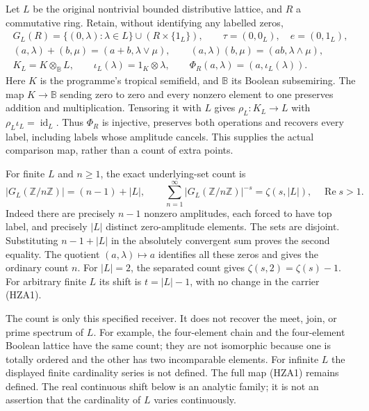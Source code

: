 Let $L$ be the original nontrivial bounded distributive lattice, and $R$
a commutative ring. Retain, without identifying any labelled zeros,
\begin{equation}\tag{HZA1}
\begin{gathered}
G_L(R)=\{(0,\lambda):\lambda\in L\}\cup(R\times\{1_L\}),\qquad
\tau=(0,0_L),\quad e=(0,1_L),\\
(a,\lambda)+(b,\mu)=(a+b,\lambda\vee\mu),\qquad
(a,\lambda)(b,\mu)=(ab,\lambda\wedge\mu),\\
K_L=K\otimes_{\mathbb B}L,\qquad
\iota_L(\lambda)=1_K\otimes\lambda,\qquad
\Phi_R(a,\lambda)=(a,\iota_L(\lambda)).
\end{gathered}
\end{equation}
Here $K$ is the programme's tropical semifield, and $\mathbb B$ its
Boolean subsemiring. The map $K\to\mathbb B$ sending zero to zero and
every nonzero element to one preserves addition and multiplication.
Tensoring it with $L$ gives $\rho_L:K_L\to L$ with
$\rho_L\iota_L=\operatorname{id}_L$. Thus $\Phi_R$ is injective,
preserves both operations and recovers every label, including labels
whose amplitude cancels. This supplies the actual comparison map,
rather than a count of extra points.

For finite $L$ and $n\ge1$, the exact underlying-set count is
\begin{equation}\tag{HZA2}
\left|G_L(\mathbb Z/n\mathbb Z)\right|=(n-1)+|L|,
\qquad
\sum_{n=1}^{\infty}\left|G_L(\mathbb Z/n\mathbb Z)\right|^{-s}
=\zeta(s,|L|),\quad \operatorname{Re}s>1.
\end{equation}
Indeed there are precisely $n-1$ nonzero amplitudes, each forced to
have top label, and precisely $|L|$ distinct zero-amplitude elements.
The sets are disjoint. Substituting $n-1+|L|$ in the absolutely
convergent sum proves the second equality. The quotient
$(a,\lambda)\mapsto a$ identifies all these zeros and gives the
ordinary count $n$. For $|L|=2$, the separated count gives
$\zeta(s,2)=\zeta(s)-1$. For arbitrary finite $L$ its shift is
$t=|L|-1$, with no change in the carrier (HZA1).

The count is only this specified receiver. It does not recover the
meet, join, or prime spectrum of $L$. For example, the four-element
chain and the four-element Boolean lattice have the same count;
they are not isomorphic because one is totally ordered and the other
has two incomparable elements. For infinite $L$ the displayed finite
cardinality series is not defined. The full map (HZA1) remains
defined. The real continuous shift below is an analytic family;
it is not an assertion that the cardinality of $L$ varies continuously.

